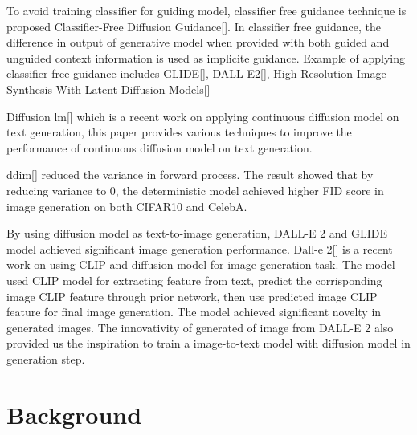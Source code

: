 \documentclass{article}
\begin{document}
To avoid training classifier for guiding model, classifier free guidance technique is proposed Classifier-Free Diffusion Guidance[]. In classifier free guidance, the difference in output of generative model when provided with both guided and unguided context information is used as implicite guidance. Example of applying classifier free guidance includes GLIDE[], DALL-E2[], High-Resolution Image Synthesis With Latent Diffusion Models[]

Diffusion lm[] which is a recent work on applying continuous diffusion model on text generation, this paper provides various techniques to improve the performance of continuous diffusion model on text generation. 

ddim[] reduced the variance in forward process. The result showed that by reducing variance to 0, the deterministic model achieved higher FID score in image generation on both CIFAR10 and CelebA. 

By using diffusion model as text-to-image generation, DALL-E 2 and GLIDE model achieved significant image generation performance. Dall-e 2[] is a recent work on using CLIP and diffusion model for image generation task. The model used CLIP model for extracting feature from text, predict the corrisponding image CLIP feature through prior network, then use predicted image CLIP feature for final image generation. The model achieved significant novelty in generated images. The innovativity of generated of image from DALL-E 2 also provided us the inspiration to train a image-to-text model with diffusion model in generation step. 

\section{Background}
\end{document}
